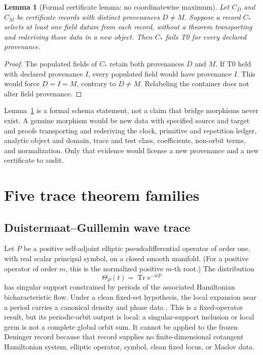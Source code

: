 \documentclass[11pt]{article}
\newtheorem{lemma}[theorem]{Lemma}
\theoremstyle{definition}
\theoremstyle{remark}
\newcommand{\Tr}{\operatorname{Tr}}
\newcommand{\e}{\mathrm{e}}
\begin{document}
\begin{lemma}[Formal certificate lemma: no coordinatewise maximum]
\label{lem:splice}
Let \(C_D\) and \(C_M\) be certificate records with distinct provenances
\(D\ne M\).  Suppose a record \(C_*\) selects at least one field datum from
each record, without a theorem transporting and rederiving those data in a
new object.  Then \(C_*\) fails T0 for every declared provenance.
\end{lemma}

\begin{proof}
The populated fields of \(C_*\) retain both provenances \(D\) and \(M\).  If
T0 held with declared provenance \(I\), every populated field would have
provenance \(I\).  This would force \(D=I=M\), contrary to \(D\ne M\).
Relabeling the container does not alter field provenance.
\end{proof}

Lemma~\ref{lem:splice} is a formal schema statement, not a claim that bridge
morphisms never exist.  A genuine morphism would be new data with specified
source and target and proofs transporting and rederiving the clock, primitive
and repetition ledger, analytic object and domain, trace and test class,
coefficients, non-orbit terms, and normalization.  Only that evidence would
license a new provenance and a new certificate to audit.

\section{Five trace theorem families}
\label{sec:taxonomy}

\subsection{Duistermaat--Guillemin wave trace}

Let \(P\) be a positive self-adjoint elliptic pseudodifferential operator of
order one, with real scalar principal symbol, on a closed smooth manifold.
(For a positive operator of order \(m\), this is the normalized positive
\(m\)-th root.)  The distribution
\[
 \Theta_P(t)=\Tr\e^{-itP}
\]
has singular support constrained by periods of the associated Hamiltonian
bicharacteristic flow.  Under a clean fixed-set hypothesis, the local
expansion near a period carries a canonical density and phase data
\citep{DuistermaatGuillemin1975}.  This is a fixed-operator result, but its
periodic-orbit output is local: a singular-support inclusion or local germ is
not a complete global orbit sum.  It cannot be applied to the frozen Deninger
record because that record supplies no finite-dimensional cotangent
Hamiltonian system, elliptic operator, symbol, clean fixed locus, or Maslov
data.
\end{document}
